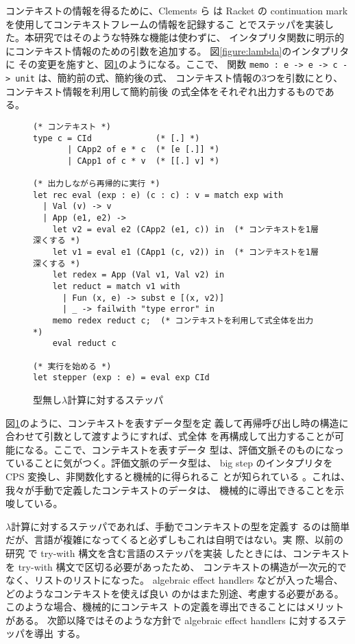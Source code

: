 コンテキストの情報を得るために、Clements ら\cite{clements01} は Racket
の continuation mark を使用してコンテキストフレームの情報を記録するこ
とでステッパを実装した。本研究ではそのような特殊な機能は使わずに、
インタプリタ関数に明示的にコンテキスト情報のための引数を追加する。
図\ref{figure:lambda}のインタプリタに
その変更を施すと、図\ref{figure:lambda_stepper}のようになる。ここで、
関数 \texttt{memo :\ e -> e -> c -> unit} は、簡約前の式、簡約後の式、
コンテキスト情報の3つを引数にとり、コンテキスト情報を利用して簡約前後
の式全体をそれぞれ出力するものである。

\begin{figure}
\begin{spacing}{0.8}
\begin{verbatim}
(* コンテキスト *)
type c = CId             (* [.] *)
       | CApp2 of e * c  (* [e [.]] *)
       | CApp1 of c * v  (* [[.] v] *)

(* 出力しながら再帰的に実行 *)
let rec eval (exp : e) (c : c) : v = match exp with
  | Val (v) -> v
  | App (e1, e2) ->
    let v2 = eval e2 (CApp2 (e1, c)) in  (* コンテキストを1層深くする *)
    let v1 = eval e1 (CApp1 (c, v2)) in  (* コンテキストを1層深くする *)
    let redex = App (Val v1, Val v2) in
    let reduct = match v1 with
      | Fun (x, e) -> subst e [(x, v2)]
      | _ -> failwith "type error" in
    memo redex reduct c;  (* コンテキストを利用して式全体を出力 *)
    eval reduct c

(* 実行を始める *)
let stepper (exp : e) = eval exp CId
\end{verbatim}
\caption{型無し$\lambda$計算に対するステッパ}
\label{figure:lambda_stepper}
\end{spacing}
\end{figure}

図\ref{figure:lambda_stepper}のように、コンテキストを表すデータ型を定
義して再帰呼び出し時の構造に合わせて引数として渡すようにすれば、式全体
を再構成して出力することが可能になる。ここで、コンテキストを表すデータ
型は、評価文脈そのものになっていることに気がつく。評価文脈のデータ型は、
big step のインタプリタを CPS 変換し、非関数化すると機械的に得られるこ
とが知られている \cite{AK2010, 10.1145/1411204.1411206}。これは、我々が手動で定義したコンテキストのデータは、
機械的に導出できることを示唆している。

$\lambda$計算に対するステッパであれば、手動でコンテキストの型を定義す
るのは簡単だが、言語が複雑になってくると必ずしもこれは自明ではない。実
際、以前の研究 \cite{FCA19} で try-with 構文を含む言語のステッパを実装
したときには、コンテキストを try-with 構文で区切る必要があったため、
コンテキストの構造が一次元的でなく、リストのリストになった。
algebraic effect handlers などが入った場合、どのようなコンテキストを使えば良い
のかはまた別途、考慮する必要がある。このような場合、機械的にコンテキス
トの定義を導出できることにはメリットがある。
次節以降ではそのような方針で algebraic effect handlers に対するステッパを導出
する。
